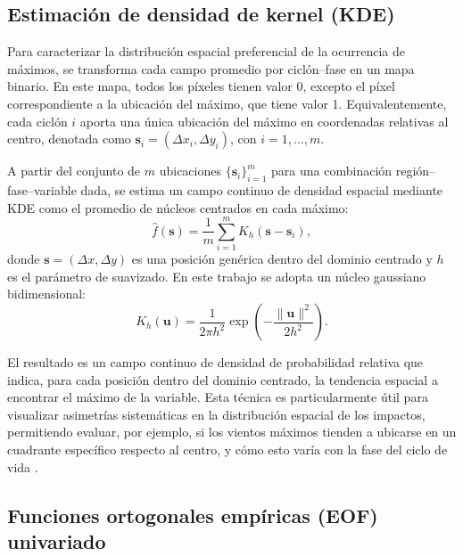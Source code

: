 \subsection{Estimación de densidad de kernel (KDE)}\label{subsec:kde_localizacion}

Para caracterizar la distribución espacial preferencial de la ocurrencia de máximos, se transforma cada campo promedio por ciclón--fase en un mapa binario. En este mapa, todos los píxeles tienen valor 0, excepto el píxel correspondiente a la ubicación del máximo, que tiene valor 1. Equivalentemente, cada ciclón $i$ aporta una única ubicación del máximo en coordenadas relativas al centro, denotada como $\mathbf{s}_i=(\Delta x_i,\Delta y_i)$, con $i=1,\dots,m$.

A partir del conjunto de $m$ ubicaciones $\{\mathbf{s}_i\}_{i=1}^{m}$ para una combinación región--fase--variable dada, se estima un campo continuo de densidad espacial mediante KDE como el promedio de núcleos centrados en cada máximo:
\begin{equation}
\hat f(\mathbf{s})=\frac{1}{m}\sum_{i=1}^{m} K_h(\mathbf{s}-\mathbf{s}_i),
\label{eq:kde_simple}
\end{equation}
donde $\mathbf{s}=(\Delta x,\Delta y)$ es una posición genérica dentro del dominio centrado y $h$ es el parámetro de suavizado. En este trabajo se adopta un núcleo gaussiano bidimensional:
\begin{equation}
K_h(\mathbf{u})=\frac{1}{2\pi h^2}\exp\!\left(-\frac{\|\mathbf{u}\|^2}{2h^2}\right).
\label{eq:gauss_kernel_2d_simple}
\end{equation}

El resultado es un campo continuo de densidad de probabilidad relativa que indica, para cada posición dentro del dominio centrado, la tendencia espacial a encontrar el máximo de la variable. Esta técnica es particularmente útil para visualizar asimetrías sistemáticas en la distribución espacial de los impactos, permitiendo evaluar, por ejemplo, si los vientos máximos tienden a ubicarse en un cuadrante específico respecto al centro, y cómo esto varía con la fase del ciclo de vida \citep{gramcianinov2023impact}.


\subsection{Funciones ortogonales empíricas (EOF) univariado}\label{subsec:eof_univariado}

